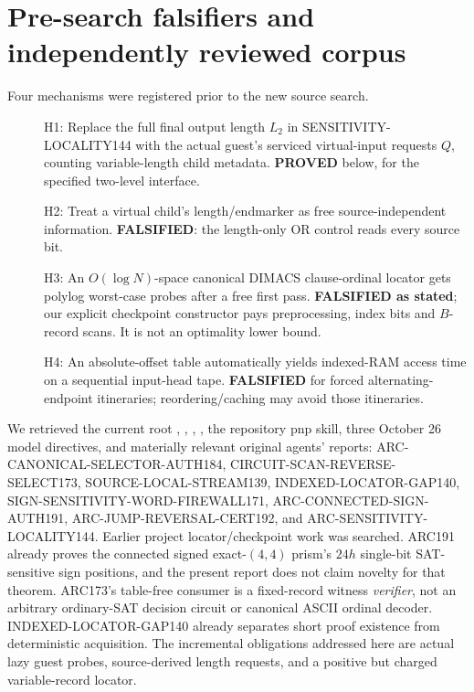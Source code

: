 \documentclass[11pt]{article}
\begin{document}
\section{Pre-search falsifiers and independently reviewed corpus}
Four mechanisms were registered prior to the new source search.
\begin{description}
\item[] H1: Replace the full final output length $L_2$ in SENSITIVITY-LOCALITY144 with the actual guest's serviced virtual-input requests $Q$, counting variable-length child metadata. \textbf{PROVED} below, for the specified two-level interface.
\item[] H2: Treat a virtual child's length/endmarker as free source-independent information. \textbf{FALSIFIED}: the length-only OR control reads every source bit.
\item[] H3: An $O(\log N)$-space canonical DIMACS clause-ordinal locator gets polylog worst-case probes after a free first pass. \textbf{FALSIFIED as stated}; our explicit checkpoint constructor pays preprocessing, index bits and $B$-record scans. It is not an optimality lower bound.
\item[] H4: An absolute-offset table automatically yields indexed-RAM access time on a sequential input-head tape. \textbf{FALSIFIED} for forced alternating-endpoint itineraries; reordering/caching may avoid those itineraries.
\end{description}
We retrieved the current root , , , , the repository pnp skill, three October 26 model directives, and materially relevant original agents' reports: ARC-CANONICAL-SELECTOR-AUTH184, CIRCUIT-SCAN-REVERSE-SELECT173, SOURCE-LOCAL-STREAM139, INDEXED-LOCATOR-GAP140, SIGN-SENSITIVITY-WORD-FIREWALL171, ARC-CONNECTED-SIGN-AUTH191, ARC-JUMP-REVERSAL-CERT192, and ARC-SENSITIVITY-LOCALITY144. Earlier project locator/checkpoint work was searched. ARC191 already proves the connected signed exact-$(4,4)$ prism's $24h$ single-bit SAT-sensitive sign positions, and the present report does not claim novelty for that theorem. ARC173's table-free consumer is a fixed-record witness \emph{verifier}, not an arbitrary ordinary-SAT decision circuit or canonical ASCII ordinal decoder. INDEXED-LOCATOR-GAP140 already separates short proof existence from deterministic acquisition. The incremental obligations addressed here are actual lazy guest probes, source-derived length requests, and a positive but charged variable-record locator.
\end{document}
